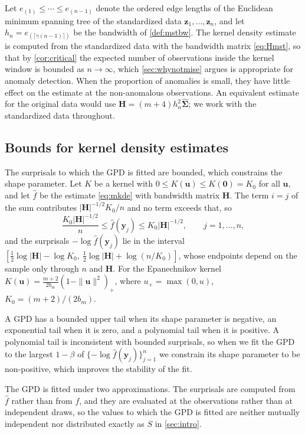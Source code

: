 Let $e_{(1)} \le \cdots \le e_{(n-1)}$ denote the ordered edge lengths of the Euclidean minimum spanning tree of the standardized data $\bm{z}_1,\dots,\bm{z}_n$, and let $h_n = e_{(\lceil\gamma(n-1)\rceil)}$ be the bandwidth of \cref{def:mstbw}. The kernel density estimate is computed from the standardized data with the bandwidth matrix \eqref{eq:Hmst}, so that by \cref{cor:critical} the expected number of observations inside the kernel window is bounded as $n\to\infty$, which \cref{sec:whynotmise} argues is appropriate for anomaly detection. When the proportion of anomalies is small, they have little effect on the estimate at the non-anomalous observations. An equivalent estimate for the original data would use $\bm{H} = (m+4)h_n^2\hat{\bm{\Sigma}}$; we work with the standardized data throughout.

\subsection{Bounds for kernel density estimates}

The surprisals to which the GPD is fitted are bounded, which constrains the shape parameter. Let $K$ be a kernel with $0\le K(\bm{u})\le K(\bm{0})=K_0$ for all $\bm{u}$, and let $\hat{f}$ be the estimate \eqref{eq:mkde} with bandwidth matrix $\bm{H}$. The term $i=j$ of the sum contributes $|\bm{H}|^{-1/2}K_0/n$ and no term exceeds that, so
$$
\frac{K_0|\bm{H}|^{-1/2}}{n} \le \hat{f}(\bm{y}_j) \le K_0|\bm{H}|^{-1/2}, \qquad j = 1,\dots,n,
$$
and the surprisals $-\log\hat{f}(\bm{y}_j)$ lie in the interval $[\tfrac12\log|\bm{H}| - \log K_0,\ \tfrac12\log|\bm{H}| + \log(n/K_0)]$, whose endpoints depend on the sample only through $n$ and $\bm{H}$. For the Epanechnikov kernel $K(\bm{u}) = \frac{m+2}{2b_m} ( 1 - \|\bm{u}\|^2 )_{+}$, where $u_+ = \max(0, u)$, $K_0 = (m+2)/(2b_m)$.

A GPD has a bounded upper tail when its shape parameter is negative, an exponential tail when it is zero, and a polynomial tail when it is positive. A polynomial tail is inconsistent with bounded surprisals, so when we fit the GPD to the largest $1-\beta$ of $\{-\log\hat{f}(\bm{y}_j)\}_{j=1}^n$ we constrain its shape parameter to be non-positive, which improves the stability of the fit.

The GPD is fitted under two approximations. The surprisals are computed from $\hat{f}$ rather than from $f$, and they are evaluated at the observations rather than at independent draws, so the values to which the GPD is fitted are neither mutually independent nor distributed exactly as $S$ in \cref{sec:intro}.

